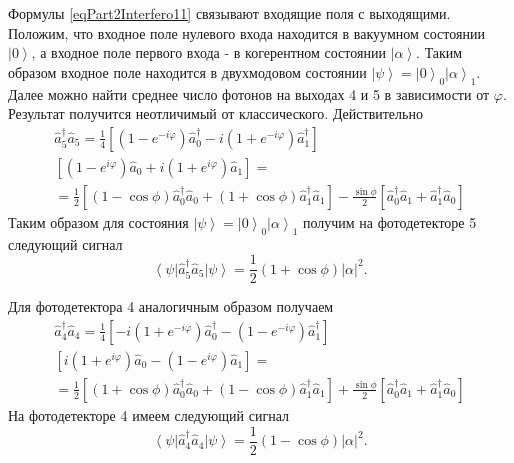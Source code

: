 Формулы \eqref{eqPart2Interfero11} связывают входящие поля с
выходящими. Положим, что входное поле нулевого входа находится в
вакуумном состоянии $\left|0\right>$, а входное поле первого входа - в
когерентном состоянии $\left|\alpha\right>$. Таким образом входное
поле находится в двухмодовом состоянии $\left|\psi\right> =
\left|0\right>_0\left|\alpha\right>_1$. Далее можно найти
среднее число фотонов на выходах 4 и 5 в зависимости от
$\varphi$. Результат получится неотличимый от классического.
Действительно
\begin{eqnarray}
  \hat{a}_5^{\dag}\hat{a}_5 =
  \frac{1}{4}
  \left[
    \left(1 - e^{-i \varphi}\right)\hat{a}_0^{\dag} -
    i \left(1 + e^{-i \varphi}\right)\hat{a}_1^{\dag}
    \right]
  \nonumber \\
  \left[
    \left(1 - e^{i \varphi}\right)\hat{a}_0 +
    i \left(1 + e^{i \varphi}\right)\hat{a}_1
    \right] = 
  \nonumber \\
  = \frac{1}{2}
  \left[
    \left(
    1 -  \cos \phi 
    \right)
    \hat{a}_0^{\dag}\hat{a}_0 +
    \left(
    1 +  \cos \phi 
    \right)
    \hat{a}_1^{\dag}\hat{a}_1
    \right] -
  \frac{\sin \phi}{2}
  \left[
    \hat{a}_0^{\dag}\hat{a}_1 +
    \hat{a}_1^{\dag}\hat{a}_0
    \right]
  \label{eqPart2InterferoA55}
\end{eqnarray}
Таким образом для состояния $\left|\psi\right> =
\left|0\right>_0\left|\alpha\right>_1$ получим на фотодетекторе 5
следующий сигнал
\[
\left<\psi\right|\hat{a}^{\dag}_5 \hat{a}_5\left|\psi\right> =
\frac{1}{2}\left(1+\cos \phi \right) \left|\alpha\right|^2.
\]

Для фотодетектора 4 аналогичным образом получаем
\begin{eqnarray}
  \hat{a}_4^{\dag}\hat{a}_4 =
  \frac{1}{4}
  \left[
    - i \left(1 + e^{-i \varphi}\right)\hat{a}_0^{\dag} -
    \left(1 - e^{-i \varphi}\right)\hat{a}_1^{\dag}
    \right]
  \nonumber \\
  \left[
    i \left(1 + e^{i \varphi}\right)\hat{a}_0 -
    \left(1 - e^{i \varphi}\right)\hat{a}_1
    \right] = 
  \nonumber \\
  = \frac{1}{2}
  \left[
    \left(
    1 +  \cos \phi 
    \right)
    \hat{a}_0^{\dag}\hat{a}_0 +
    \left(
    1 -  \cos \phi 
    \right)
    \hat{a}_1^{\dag}\hat{a}_1
    \right] +
  \frac{\sin \phi}{2}
  \left[
    \hat{a}_0^{\dag}\hat{a}_1 +
    \hat{a}_1^{\dag}\hat{a}_0
    \right]
  \label{eqPart2InterferoA44}
\end{eqnarray}
На фотодетекторе 4 имеем
следующий сигнал
\[
\left<\psi\right|\hat{a}^{\dag}_4 \hat{a}_4\left|\psi\right> =
\frac{1}{2}\left(1-\cos \phi \right) \left|\alpha\right|^2.
\]

